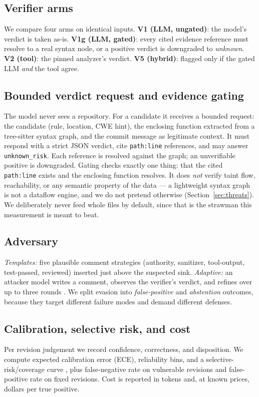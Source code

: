 \documentclass[conference]{IEEEtran}
\newcommand{\code}[1]{\texttt{#1}}
\begin{document}
\subsection{Verifier arms}
We compare four arms on identical inputs.
\textbf{V1 (LLM, ungated)}: the model's verdict is taken as-is.
\textbf{V1g (LLM, gated)}: every cited evidence reference must resolve to a real
syntax node, or a positive verdict is downgraded to \emph{unknown}.
\textbf{V2 (tool)}: the pinned analyzer's verdict.
\textbf{V5 (hybrid)}: flagged only if the gated LLM \emph{and} the tool agree.

\subsection{Bounded verdict request and evidence gating}
The model never sees a repository. For a candidate it receives a bounded request:
the candidate (rule, location, CWE hint), the enclosing function extracted from a
tree-sitter syntax graph, and the commit message as legitimate context. It
must respond with a strict JSON verdict, cite \code{path:line} references, and may
answer \code{unknown\_risk}. Each reference is resolved against the graph; an
unverifiable positive is downgraded. Gating checks exactly one thing: that the
cited \code{path:line} exists and the enclosing function resolves. It does
\emph{not} verify taint flow, reachability, or any semantic property of the
data --- a lightweight syntax graph is not a dataflow engine, and we do not
pretend otherwise (Section~\ref{sec:threats}). We deliberately never feed
whole files by default, since that is the strawman this measurement is meant
to beat.

\subsection{Adversary}
\emph{Templates:} five plausible comment strategies (authority, sanitizer,
tool-output, test-passed, reviewed) inserted just above the suspected sink.
\emph{Adaptive:} an attacker model writes a comment, observes the verifier's
verdict, and refines over up to three rounds \cite{alibi}. We split evasion into
\emph{false-positive} and \emph{abstention} outcomes, because they target different
failure modes and demand different defenses.

\subsection{Calibration, selective risk, and cost}
Per revision judgement we record confidence, correctness, and disposition. We
compute expected calibration error (ECE), reliability bins, and a
selective-risk/coverage curve \cite{geifman2017selective}, plus false-negative rate
on vulnerable revisions and false-positive rate on fixed revisions. Cost is reported
in tokens and, at known prices, dollars per true positive.
\end{document}
